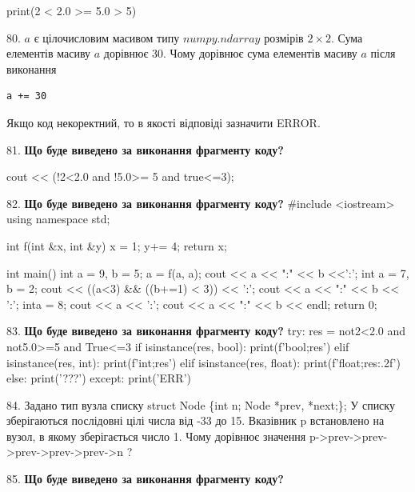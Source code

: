 \documentclass[11pt]{article}
\begin{document}
print(2 < 2.0 >= 5.0 > 5)
\par\vspace{5mm}
80. 
$a$ є цілочисловим масивом типу $numpy.ndarray$ розмірів $2{\times}2$. Сума елементів масиву $a$ дорівнює 30. Чому дорівнює сума елементів масиву $a$ після виконання 
\begin{verbatim}
a += 30
\end{verbatim}


Якщо код некоректний, то в якості відповіді зазначити ERROR.


\par\vspace{5mm}
81. \textbf{Що буде виведено за виконання фрагменту коду?}

cout << (!2<2.0 and !5.0>= 5 and true<=3);
\par\vspace{5mm}
82. \textbf{Що буде виведено за виконання фрагменту коду?}
#include <iostream>
using namespace std;

int f(int &x, int &y){
    x = 1;
    y+= 4;
    return x;
}

int main(){
    int a = 9, b = 5;
    a = f(a, a);
    cout << a << ":" << b <<':';
    {
        int a = 7, b = 2;
        cout << ((a<3) && ((b+=1) < 3)) << ':';
        cout << a << ":" << b << ':';
    }
    {
        inta = 8;
        cout << a << ':';
    }
    cout << a << ":" << b << endl;
    return 0;
}

\par\vspace{5mm}
83. \textbf{Що буде виведено за виконання фрагменту коду?}
try:
    res = not2<2.0 and not5.0>=5 and True<=3
    if isinstance(res, bool):
        print(f'bool;{res}')
    elif isinstance(res, int):
        print(f'int;{res}')
    elif isinstance(res, float):
        print(f'float;{res:.2f}')
    else:
        print('???')
except:
    print('ERR')
\par\vspace{5mm}
84. 
Задано тип вузла списку
struct Node \{int n; Node *prev, *next;\};
У списку зберігаються послідовні цілі числа від -33 до 15. Вказівник p встановлено на вузол, в якому зберігається число 1.
Чому дорівнює значення p->prev->prev->prev->prev->prev->n ?\par\vspace{5mm}
85. \textbf{Що буде виведено за виконання фрагменту коду?}
\end{document}
